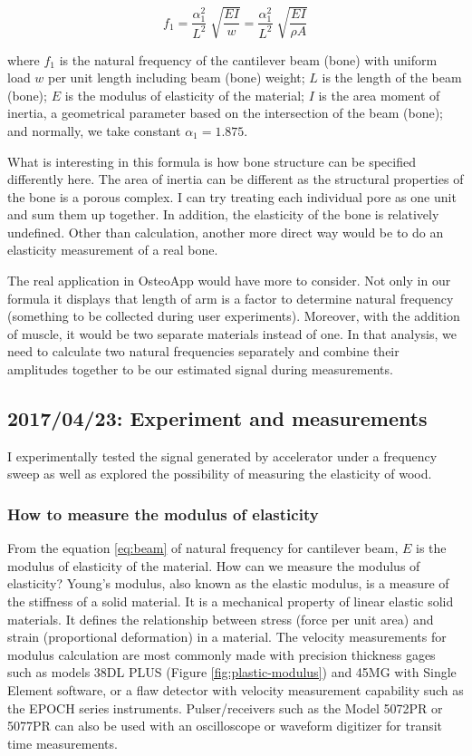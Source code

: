 \documentclass{sigchi}
\begin{document}
\begin{equation} \label{eq:beam}
f_1=\frac{\alpha_1^2}{L^2}\sqrt[]{\frac{EI}{w}}=\frac{\alpha_1^2}{L^2}\sqrt[]{\frac{EI}{\rho A}} 
\end{equation}

where $f_1$ is the natural frequency of the cantilever beam (bone) with uniform load $w$ per unit length including beam (bone) weight; $L$ is the length of the beam (bone); $E$ is the modulus of elasticity of the material; $I$ is the area moment of inertia, a geometrical parameter based on the intersection of the beam (bone); and normally, we take constant $\alpha_1 = 1.875$.

What is interesting in this formula is how bone structure can be specified differently here. The area of inertia can be different as the structural properties of the bone is a porous complex. I can try treating each individual pore as one unit and sum them up together. In addition, the elasticity of the bone is relatively undefined. Other than calculation, another more direct way would be to do an elasticity measurement of a real bone. 
 
The real application in OsteoApp would have more to consider. Not only in our formula it displays that length of arm is a factor to determine natural frequency (something to be collected during user experiments). Moreover, with the addition of muscle, it would be two separate materials instead of one. In that analysis, we need to calculate two natural frequencies separately and combine their amplitudes together to be our estimated signal during measurements. 

\subsection{2017/04/23: Experiment and measurements}

I experimentally tested the signal generated by accelerator under a frequency sweep as well as explored the possibility of measuring the elasticity of wood. 

\subsubsection{How to measure the modulus of elasticity} 

From the equation \eqref{eq:beam} of natural frequency for cantilever beam, $E$ is the modulus of elasticity of the material. How can we measure the modulus of elasticity? Young's modulus, also known as the elastic modulus, is a measure of the stiffness of a solid material. It is a mechanical property of linear elastic solid materials. It defines the relationship between stress (force per unit area) and strain (proportional deformation) in a material. The velocity measurements for modulus calculation are most commonly made with precision thickness gages such as models 38DL PLUS (Figure \ref{fig:plastic-modulus}) and 45MG with Single Element software,  or a flaw detector with velocity measurement capability such as the EPOCH series instruments. Pulser/receivers such as the Model 5072PR or 5077PR can also be used with an oscilloscope or waveform digitizer for transit time measurements. 
\end{document}
